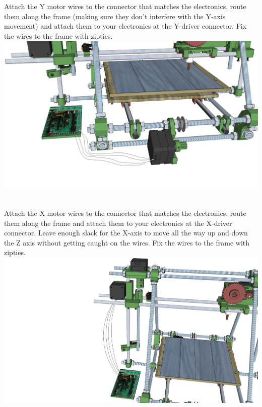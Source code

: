 \documentclass[twoside,openany,a4paper,titlepage]{memoir}
\begin{document}
	\section{}
	Attach the Y motor wires to the connector that matches the electronics, route them along the frame
	(making sure they don't interfere with the Y-axis movement) and attach them to your electronics at the
	Y-driver connector. Fix the wires to the frame with zipties.\\
	\includegraphics[width=1\linewidth]{graphics/ch10_14.png}
	
	\section{}
	Attach the X motor wires to the connector that matches the electronics, route them along the frame and
	attach them to your electronics at the X-driver connector. Leave enough slack for the X-axis to move all
	the way up and down the Z axis without getting caught on the wires. Fix the wires to the frame with
	zipties.\\
	\includegraphics[width=1\linewidth]{graphics/ch10_15.png}
	
\end{document}
